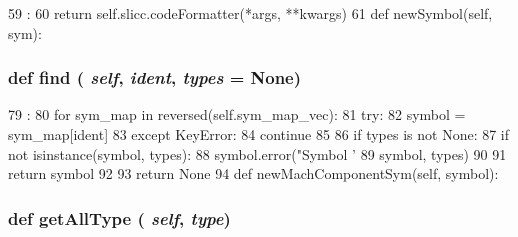 \begin{DoxyCode}
59                                             :
60         return self.slicc.codeFormatter(*args, **kwargs)
61 
    def newSymbol(self, sym):
\end{DoxyCode}
\hypertarget{classslicc_1_1symbols_1_1SymbolTable_1_1SymbolTable_a01f90f57b7acd55e177611f5d0f7df23}{
\subsubsection[{find}]{\setlength{\rightskip}{0pt plus 5cm}def find ( {\em self}, \/   {\em ident}, \/   {\em types} = {\ttfamily None})}}
\label{classslicc_1_1symbols_1_1SymbolTable_1_1SymbolTable_a01f90f57b7acd55e177611f5d0f7df23}



\begin{DoxyCode}
79                                      :
80         for sym_map in reversed(self.sym_map_vec):
81             try:
82                 symbol = sym_map[ident]
83             except KeyError:
84                 continue
85 
86             if types is not None:
87                 if not isinstance(symbol, types):
88                     symbol.error("Symbol '%
89                                  symbol, types)
90 
91             return symbol
92 
93         return None
94 
    def newMachComponentSym(self, symbol):
\end{DoxyCode}
\hypertarget{classslicc_1_1symbols_1_1SymbolTable_1_1SymbolTable_a500fe67d455c73b37149cd61c46a4752}{
\subsubsection[{getAllType}]{\setlength{\rightskip}{0pt plus 5cm}def getAllType ( {\em self}, \/   {\em type})}}
\label{classslicc_1_1symbols_1_1SymbolTable_1_1SymbolTable_a500fe67d455c73b37149cd61c46a4752}



